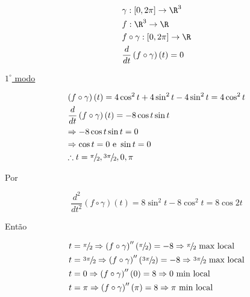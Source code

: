 \documentclass{book}
\begin{document}
\begin{enumerate}
\begin{sol}
\begin{enumerate}[(a)]
\[
\begin{gathered}
  \gamma :\left[ {0,2\pi } \right] \to \R^3  \hfill \\
  f:\R^3  \to \R \hfill \\
  f \circ \gamma :\left[ {0,2\pi } \right] \to \R \hfill \\
  \frac{d}
{{dt}}\left( {f \circ \gamma } \right)\left( t \right) = 0 \hfill \\
\end{gathered}
\]

\uline{$1^\circ$ modo}

\[
\begin{gathered}
  \left( {f \circ \gamma } \right)\left( t \right) = 4\cos ^2 t + 4\sin ^2 t - 4\sin ^2 t = 4\cos ^2 t \hfill \\
  \frac{d}
{{dt}}\left( {f \circ \gamma } \right)\left( t \right) =  - 8\cos t\sin t \hfill \\
   \Rightarrow  - 8\cos t\sin t = 0 \hfill \\
   \Rightarrow \cos t = 0{\text{ e }}\sin t = 0 \hfill \\
  \therefore t = {\raise0.5ex\hbox{$\scriptstyle \pi $}
\kern-0.1em/\kern-0.15em
\lower0.25ex\hbox{$\scriptstyle 2$}},{\raise0.5ex\hbox{$\scriptstyle {3\pi }$}
\kern-0.1em/\kern-0.15em
\lower0.25ex\hbox{$\scriptstyle 2$}},0,\pi  \hfill \\
\end{gathered}
\]

Por

\[
\frac{{d^2 }}
{{dt^2 }}\left( {f \circ \gamma } \right)\left( t \right) = 8\sin ^2 t - 8\cos ^2 t = 8\cos 2t
\]

Ent\~ao

\[
\begin{gathered}
  t = {\raise0.5ex\hbox{$\scriptstyle \pi $}
\kern-0.1em/\kern-0.15em
\lower0.25ex\hbox{$\scriptstyle 2$}} \Rightarrow \left( {f \circ \gamma } \right)''\left( {{\raise0.5ex\hbox{$\scriptstyle \pi $}
\kern-0.1em/\kern-0.15em
\lower0.25ex\hbox{$\scriptstyle 2$}}} \right) =  - 8 \Rightarrow {\raise0.5ex\hbox{$\scriptstyle \pi $}
\kern-0.1em/\kern-0.15em
\lower0.25ex\hbox{$\scriptstyle 2$}}{\text{ max local}} \hfill \\
  t = {\raise0.5ex\hbox{$\scriptstyle {3\pi }$}
\kern-0.1em/\kern-0.15em
\lower0.25ex\hbox{$\scriptstyle 2$}} \Rightarrow \left( {f \circ \gamma } \right)''\left( {{\raise0.5ex\hbox{$\scriptstyle {3\pi }$}
\kern-0.1em/\kern-0.15em
\lower0.25ex\hbox{$\scriptstyle 2$}}} \right) =  - 8 \Rightarrow {\raise0.5ex\hbox{$\scriptstyle {3\pi }$}
\kern-0.1em/\kern-0.15em
\lower0.25ex\hbox{$\scriptstyle 2$}}{\text{ max local}} \hfill \\
  t = 0 \Rightarrow \left( {f \circ \gamma } \right)''\left( 0 \right) = 8 \Rightarrow 0{\text{ min local}} \hfill \\
  t = \pi  \Rightarrow \left( {f \circ \gamma } \right)''\left( \pi  \right) = 8 \Rightarrow \pi {\text{ min local}} \hfill \\
\end{gathered}
\]


\end{enumerate}
\end{sol}
\end{enumerate}
\end{document}
